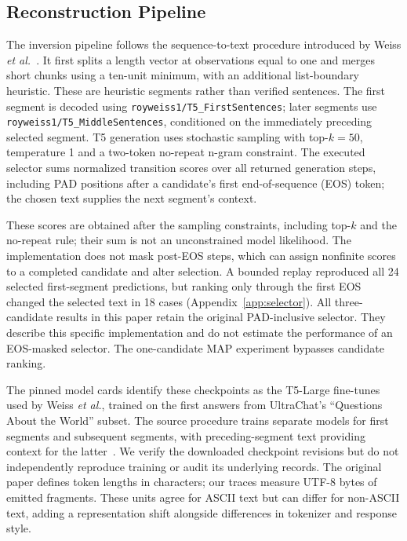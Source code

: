 \documentclass[electronics,article,submit,pdftex,moreauthors]{Definitions/mdpi}
\begin{document}
\subsection{Reconstruction Pipeline}\label{sec:reconstructor}
The inversion pipeline follows the sequence-to-text procedure introduced by Weiss \emph{et al.}~\cite{weiss2024prompt}. It first splits a length vector at observations equal to one and merges short chunks using a ten-unit minimum, with an additional list-boundary heuristic. These are heuristic segments rather than verified sentences. The first segment is decoded using \texttt{royweiss1/T5\_FirstSentences}; later segments use \texttt{royweiss1/T5\_MiddleSentences}, conditioned on the immediately preceding selected segment. T5 generation uses stochastic sampling with top-$k=50$, temperature 1 and a two-token no-repeat n-gram constraint. The executed selector sums normalized transition scores over all returned generation steps, including PAD positions after a candidate's first end-of-sequence (EOS) token; the chosen text supplies the next segment's context.

These scores are obtained after the sampling constraints, including top-$k$ and the no-repeat rule; their sum is not an unconstrained model likelihood. The implementation does not mask post-EOS steps, which can assign nonfinite scores to a completed candidate and alter selection. A bounded replay reproduced all 24 selected first-segment predictions, but ranking only through the first EOS changed the selected text in 18 cases (Appendix~\ref{app:selector}). All three-candidate results in this paper retain the original PAD-inclusive selector. They describe this specific implementation and do not estimate the performance of an EOS-masked selector. The one-candidate MAP experiment bypasses candidate ranking.

The pinned model cards identify these checkpoints as the T5-Large fine-tunes used by Weiss \emph{et al.}, trained on the first answers from UltraChat's ``Questions About the World'' subset. The source procedure trains separate models for first segments and subsequent segments, with preceding-segment text providing context for the latter~\cite{weiss2024prompt}. We verify the downloaded checkpoint revisions but do not independently reproduce training or audit its underlying records. The original paper defines token lengths in characters; our traces measure UTF-8 bytes of emitted fragments. These units agree for ASCII text but can differ for non-ASCII text, adding a representation shift alongside differences in tokenizer and response style.
\end{document}
